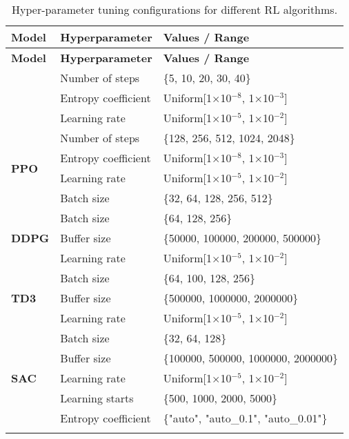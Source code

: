 \begin{longtable}{|l|l|p{8cm}|}
    \hline
    \textbf{Model} & \textbf{Hyperparameter} & \textbf{Values / Range} \\ \midrule
    \endfirsthead

    \hline
    \textbf{Model} & \textbf{Hyperparameter} & \textbf{Values / Range} \\ \midrule
    \endhead

    \endfoot

    \hline
    \multirow{3}{*}{\textbf{A2C}}
    & Number of steps & \{5, 10, 20, 30, 40\} \\
    & Entropy coefficient & Uniform[1$\times$10$^{-8}$, 1$\times$10$^{-3}$] \\ 
    & Learning rate & Uniform[1$\times$10$^{-5}$, 1$\times$10$^{-2}$] \\ \hline

    \multirow{4}{*}{\textbf{PPO}}
    & Number of steps & \{128, 256, 512, 1024, 2048\} \\ 
    & Entropy coefficient & Uniform[1$\times$10$^{-8}$, 1$\times$10$^{-3}$] \\ 
    & Learning rate & Uniform[1$\times$10$^{-5}$, 1$\times$10$^{-2}$] \\ 
    & Batch size & \{32, 64, 128, 256, 512\} \\ \hline

    \multirow{3}{*}{\textbf{DDPG}}
    & Batch size & \{64, 128, 256\} \\ 
    & Buffer size & \{50000, 100000, 200000, 500000\} \\ 
    & Learning rate & Uniform[1$\times$10$^{-5}$, 1$\times$10$^{-2}$] \\ \hline

    \multirow{3}{*}{\textbf{TD3}}
    & Batch size & \{64, 100, 128, 256\} \\ 
    & Buffer size & \{500000, 1000000, 2000000\} \\ 
    & Learning rate & Uniform[1$\times$10$^{-5}$, 1$\times$10$^{-2}$] \\ \hline

    \multirow{5}{*}{\textbf{SAC}}
    & Batch size & \{32, 64, 128\} \\ 
    & Buffer size & \{100000, 500000, 1000000, 2000000\} \\ 
    & Learning rate & Uniform[1$\times$10$^{-5}$, 1$\times$10$^{-2}$] \\ 
    & Learning starts & \{500, 1000, 2000, 5000\} \\ 
    & Entropy coefficient & \{"auto", "auto\_0.1", "auto\_0.01"\} \\ \hline
    \caption{Hyper-parameter tuning configurations for different RL algorithms.}
    \label{tab:model_hyperparameters}
\end{longtable}